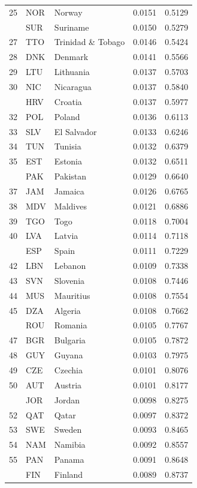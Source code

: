 \documentclass[
  12pt,
]{article}
\begin{document}
\begin{ThreePartTable}
\begin{longtable}[t]{rllrr}
25 & NOR & Norway & 0.0151 & 0.5129\\
\addlinespace
26 & SUR & Suriname & 0.0150 & 0.5279\\
27 & TTO & Trinidad \& Tobago & 0.0146 & 0.5424\\
28 & DNK & Denmark & 0.0141 & 0.5566\\
29 & LTU & Lithuania & 0.0137 & 0.5703\\
30 & NIC & Nicaragua & 0.0137 & 0.5840\\
\addlinespace
31 & HRV & Croatia & 0.0137 & 0.5977\\
32 & POL & Poland & 0.0136 & 0.6113\\
33 & SLV & El Salvador & 0.0133 & 0.6246\\
34 & TUN & Tunisia & 0.0132 & 0.6379\\
35 & EST & Estonia & 0.0132 & 0.6511\\
\addlinespace
36 & PAK & Pakistan & 0.0129 & 0.6640\\
37 & JAM & Jamaica & 0.0126 & 0.6765\\
38 & MDV & Maldives & 0.0121 & 0.6886\\
39 & TGO & Togo & 0.0118 & 0.7004\\
40 & LVA & Latvia & 0.0114 & 0.7118\\
\addlinespace
41 & ESP & Spain & 0.0111 & 0.7229\\
42 & LBN & Lebanon & 0.0109 & 0.7338\\
43 & SVN & Slovenia & 0.0108 & 0.7446\\
44 & MUS & Mauritius & 0.0108 & 0.7554\\
45 & DZA & Algeria & 0.0108 & 0.7662\\
\addlinespace
46 & ROU & Romania & 0.0105 & 0.7767\\
47 & BGR & Bulgaria & 0.0105 & 0.7872\\
48 & GUY & Guyana & 0.0103 & 0.7975\\
49 & CZE & Czechia & 0.0101 & 0.8076\\
50 & AUT & Austria & 0.0101 & 0.8177\\
\addlinespace
51 & JOR & Jordan & 0.0098 & 0.8275\\
52 & QAT & Qatar & 0.0097 & 0.8372\\
53 & SWE & Sweden & 0.0093 & 0.8465\\
54 & NAM & Namibia & 0.0092 & 0.8557\\
55 & PAN & Panama & 0.0091 & 0.8648\\
\addlinespace
56 & FIN & Finland & 0.0089 & 0.8737\\

\end{longtable}
\end{ThreePartTable}
\end{document}
